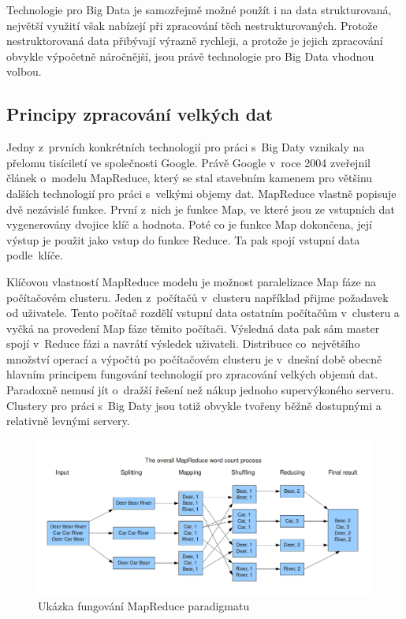 \documentclass[thesis=B,czech]{FITthesis}[2012/06/26]
\begin{document}
	Technologie pro Big Data je samozřejmě možné použít i na data strukturovaná, největší využití však nabízejí při zpracování těch nestrukturovaných. Protože nestruktorovaná data přibývají výrazně rychleji\cite{structured-unstructured}, a protože je jejich zpracování obvykle výpočetně náročnější, jsou právě technologie pro Big Data vhodnou volbou. 
 
	
\subsection{Principy zpracování velkých dat}
	Jedny z~prvních konkrétních technologií pro práci s~Big Daty vznikaly na přelomu tisíciletí ve společnosti Google. Právě Google v~roce 2004 zveřejnil článek o~modelu MapReduce\cite{mapreduce-google}, který se stal stavebním kamenem pro většinu dalších technologií pro práci s~velkými objemy dat. MapReduce vlastně popisuje dvě nezávislé funkce. První z~nich je funkce Map, ve které jsou ze vstupních dat vygenerovány dvojice klíč a hodnota. Poté co je funkce Map dokončena, její výstup je použit jako vstup do funkce Reduce. Ta pak spojí vstupní data podle~klíče\cite{mapreduce-description}. 
	
	Klíčovou vlastností MapReduce modelu je možnost paralelizace Map fáze na počítačovém clusteru. Jeden z~počítačů v~clusteru například přijme požadavek od uživatele. Tento počítač rozdělí vstupní data ostatním počítačům v~clusteru a vyčká na provedení Map fáze těmito počítači. Výsledná data pak sám master spojí v~Reduce fázi a navrátí výsledek uživateli. Distribuce co~největšího množství operací a výpočtů po počítačovém clusteru je v~dnešní době obecně hlavním principem fungování technologií pro zpracování velkých objemů dat. Paradoxně nemusí jít o~dražší řešení než nákup jednoho supervýkoného serveru. Clustery pro práci s~Big Daty jsou totiž obvykle tvořeny běžně dostupnými a relativně levnými servery. 
	
	\begin{figure}[ht]
    	\centering
    	\includegraphics[width=1\textwidth]{images/mapreduce.png}
    	\caption{Ukázka fungování MapReduce paradigmatu \cite{mapreduce-img} }
    	\label{fig:mapreduce}
	\end{figure}
	
\end{document}

